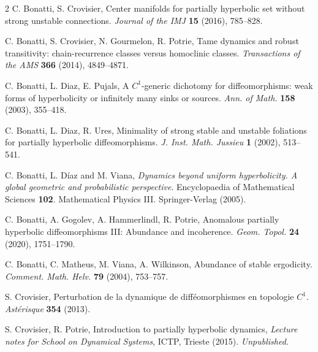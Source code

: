 \documentclass[a4paper,11pt]{amsart}
\numberwithin{equation}{section}     %
\theoremstyle{definition}
\theoremstyle{remark}
\begin{document}
\begin{thebibliography}{2}
 C. Bonatti, S. Crovisier, Center manifolds for partially hyperbolic set without strong unstable connections. \emph{Journal of the IMJ} {\bf15} (2016), 785--828.

 C. Bonatti, S. Crovisier, N. Gourmelon, R. Potrie,  Tame dynamics and robust transitivity: chain-recurrence classes versus homoclinic classes. \emph{Transactions of the AMS} {\bf 366} (2014), 4849--4871.

 C. Bonatti, L. Diaz, E. Pujals, A $C^1$-generic dichotomy for diffeomorphisms: weak forms of hyperbolicity or infinitely many sinks or sources. \emph{Ann. of Math.} {\bf 158} (2003), 355--418.


 C. Bonatti, L. Diaz, R. Ures, Minimality of strong stable and unstable foliations for partially hyperbolic diffeomorphisms. \emph{J. Inst. Math. Jussieu} {\bf 1} (2002), 513--541.

 C. Bonatti, L. D\'iaz and M. Viana, \emph{Dynamics beyond uniform hyperbolicity. A global geometric and probabilistic perspective}. Encyclopaedia of Mathematical Sciences {\bf 102}. Mathematical Physics III. Springer-Verlag (2005).

 C. Bonatti, A. Gogolev, A. Hammerlindl, R. Potrie,  Anomalous partially hyperbolic diffeomorphisms III: Abundance and incoherence. \emph{Geom. Topol.} {\bf 24} (2020), 1751--1790.

 C. Bonatti, C. Matheus, M. Viana, A. Wilkinson,  Abundance of stable ergodicity. \emph{Comment. Math. Helv.} {\bf 79} (2004), 753--757.


 S. Crovisier, Perturbation de la dynamique de diff\'eomorphismes en topologie $C^1$. \emph{Ast\'erisque} \textbf{354} (2013). 


 S. Crovisier, R. Potrie, Introduction to partially hyperbolic dynamics,  \emph{Lecture notes for School on Dynamical Systems}, ICTP, Trieste (2015). \emph{Unpublished.}


\end{thebibliography}
\end{document}
